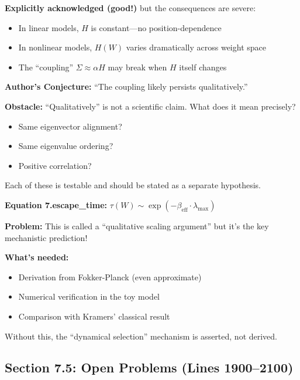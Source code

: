\documentclass[11pt]{article}
\begin{document}
\begin{vuongmacbox}
\textbf{Explicitly acknowledged (good!)} but the consequences are severe:

\begin{itemize}
    \item In linear models, $H$ is constant---no position-dependence
    \item In nonlinear models, $H(W)$ varies dramatically across weight space
    \item The ``coupling'' $\Sigma \approx \alpha H$ may break when $H$ itself changes
\end{itemize}

\textbf{Author's Conjecture:} ``The coupling likely persists qualitatively.''

\textbf{Obstacle:} ``Qualitatively'' is not a scientific claim. What does it mean precisely? 
\begin{itemize}
    \item Same eigenvector alignment?
    \item Same eigenvalue ordering?
    \item Positive correlation?
\end{itemize}
Each of these is testable and should be stated as a separate hypothesis.
\end{vuongmacbox}

\begin{missingbox}
\textbf{Equation 7.escape\_time:} $\tau(W) \sim \exp(-\beta_{\mathrm{eff}} \cdot \lambda_{\max})$

\textbf{Problem:} This is called a ``qualitative scaling argument'' but it's the key mechanistic prediction!

\textbf{What's needed:}
\begin{itemize}
    \item Derivation from Fokker-Planck (even approximate)
    \item Numerical verification in the toy model
    \item Comparison with Kramers' classical result
\end{itemize}

Without this, the ``dynamical selection'' mechanism is asserted, not derived.
\end{missingbox}

\subsection{Section 7.5: Open Problems (Lines 1900--2100)}
\end{document}
